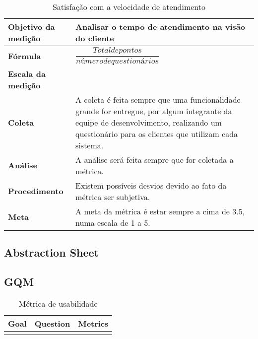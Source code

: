 \begin{table}[H]
\centering
\begin{tabular}{|p{4cm}|p{5cm}|}
\hline
	\textbf{Objetivo da medição} &
	Analisar o tempo de atendimento na visão do cliente
	\\ \hline
	\textbf{Fórmula} &
	$\dfrac{Total de pontos}{número de questionários}$
	\\ \hline
	\textbf{Escala da medição} &

	\\ \hline
	\textbf{Coleta} &
	A coleta é feita sempre que uma funcionalidade grande for entregue, por algum integrante da equipe de desenvolvimento, realizando um questionário para os clientes que utilizam cada sistema.
	\\ \hline
	\textbf{Análise} &
	A análise será feita sempre que for coletada a métrica.
	\\ \hline
	\textbf{Procedimento} &
	Existem possíveis desvios devido ao fato da métrica ser subjetiva.
	\\ \hline
  \textbf{Meta} &
	A meta da métrica é estar sempre a cima de 3.5, numa escala de 1 a 5.
  \\ \hline
\end{tabular}
\caption{Satisfação com a velocidade de atendimento}
\label{tab:satisfacao_velocidade}
\end{table}

\subsection{Abstraction Sheet}

\subsection{GQM}


\begin{table}[H]
\centering
\begin{tabular}{|c|c|c|}
\hline
	\textbf{Goal} &
  \textbf{Question} &
  \textbf{Metrics}
	\\ \hline
	 &
   &

	\\ \hline
\end{tabular}
\caption{Métrica de usabilidade}
\label{tab:métrica_de_usabilidade}
\end{table}

